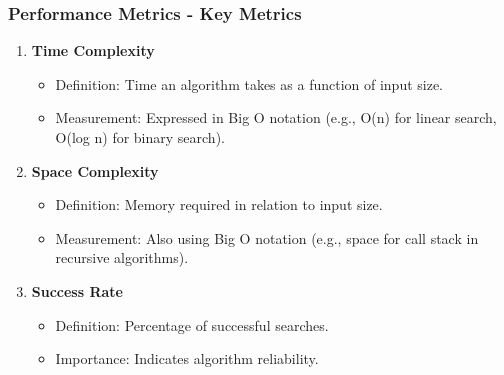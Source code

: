 \documentclass[aspectratio=169]{beamer}
\begin{document}
\begin{frame}[fragile]
    \frametitle{Performance Metrics - Key Metrics}
    \begin{enumerate}
        \item \textbf{Time Complexity}
        \begin{itemize}
            \item Definition: Time an algorithm takes as a function of input size.
            \item Measurement: Expressed in Big O notation (e.g., O(n) for linear search, O(log n) for binary search).
        \end{itemize}

        \item \textbf{Space Complexity}
        \begin{itemize}
            \item Definition: Memory required in relation to input size.
            \item Measurement: Also using Big O notation (e.g., space for call stack in recursive algorithms).
        \end{itemize}

        \item \textbf{Success Rate}
        \begin{itemize}
            \item Definition: Percentage of successful searches.
            \item Importance: Indicates algorithm reliability.
        \end{itemize}
    \end{enumerate}
\end{frame}
\end{document}
